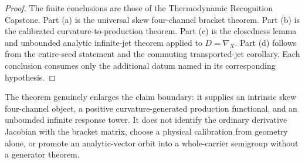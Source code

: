 \begin{proof}
The finite conclusions are those of the Thermodynamic Recognition Capstone.  Part (a) is the universal skew four-channel bracket theorem.  Part (b) is the calibrated curvature-to-production theorem.  Part (c) is the closedness lemma and unbounded analytic infinite-jet theorem applied to $D=\nabla_X$.  Part (d) follows from the entire-seed statement and the commuting transported-jet corollary.  Each conclusion consumes only the additional datum named in its corresponding hypothesis.
\end{proof}

\begin{remark}
The theorem genuinely enlarges the claim boundary: it supplies an intrinsic skew four-channel object, a positive curvature-generated production functional, and an unbounded infinite response tower.  It does not identify the ordinary derivative Jacobian with the bracket matrix, choose a physical calibration from geometry alone, or promote an analytic-vector orbit into a whole-carrier semigroup without a generator theorem.
\end{remark}
